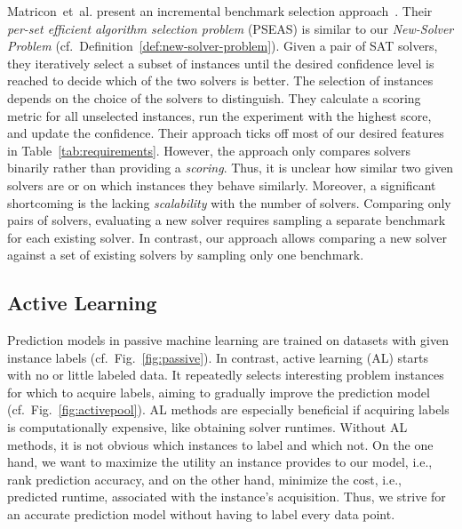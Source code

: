 \documentclass[sn-basic, Numbered]{sn-jnl} %
\begin{document}
Matricon~et~al. present an incremental benchmark selection approach~\cite{MatriconAFSH21}.
Their \emph{per-set efficient algorithm selection problem} (PSEAS) is similar to our \emph{New-Solver Problem} (cf.~Definition~\ref{def:new-solver-problem}).
Given a pair of SAT solvers, they iteratively select a subset of instances until the desired confidence level is reached to decide which of the two solvers is better.
The selection of instances depends on the choice of the solvers to distinguish.
They calculate a scoring metric for all unselected instances, run the experiment with the highest score, and update the confidence.
Their approach ticks off most of our desired features in Table~\ref{tab:requirements}.
However, the approach only compares solvers binarily rather than providing a \emph{scoring}.
Thus, it is unclear how similar two given solvers are or on which instances they behave similarly.
Moreover, a significant shortcoming is the lacking \emph{scalability} with the number of solvers.
Comparing only pairs of solvers, evaluating a new solver requires sampling a separate benchmark for each existing solver.
In contrast, our approach allows comparing a new solver against a set of existing solvers by sampling only one benchmark.

\subsection{Active Learning}

Prediction models in passive machine learning are trained on datasets with given instance labels (cf.~Fig.~\ref{fig:passive}).
In contrast, active learning (AL) starts with no or little labeled data.
It repeatedly selects interesting problem instances for which to acquire labels, aiming to gradually improve the prediction model (cf.~Fig.~\ref{fig:activepool}).
AL methods are especially beneficial if acquiring labels is computationally expensive, like obtaining solver runtimes.
Without AL methods, it is not obvious which instances to label and which not.
On the one hand, we want to maximize the utility an instance provides to our model, i.e., rank prediction accuracy, and on the other hand, minimize the cost, i.e., predicted runtime, associated with the instance's acquisition.
Thus, we strive for an accurate prediction model without having to label every data point.
\end{document}

